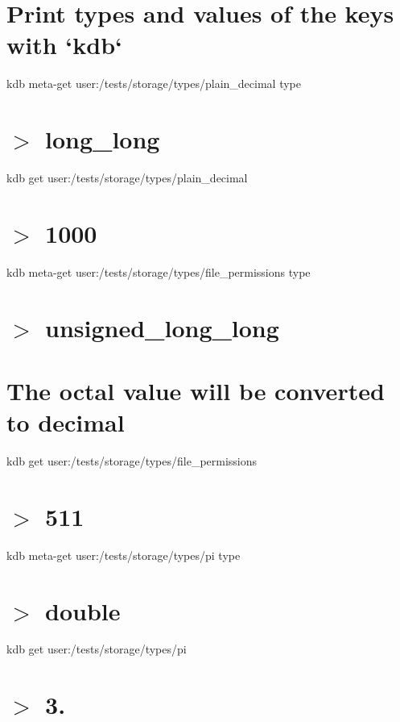 \hypertarget{autotoc_md642_autotoc_md652}{}\section{Print types and values of the keys with `kdb`}\label{autotoc_md642_autotoc_md652}
kdb meta-\/get \textquotesingle{}user\+:/tests/storage/types/plain\+\_\+decimal\textquotesingle{} \textquotesingle{}type\textquotesingle{} \hypertarget{autotoc_md642_autotoc_md653}{}\section{$>$ long\+\_\+long}\label{autotoc_md642_autotoc_md653}
kdb get \textquotesingle{}user\+:/tests/storage/types/plain\+\_\+decimal\textquotesingle{} \hypertarget{autotoc_md642_autotoc_md654}{}\section{$>$ 1000}\label{autotoc_md642_autotoc_md654}
kdb meta-\/get \textquotesingle{}user\+:/tests/storage/types/file\+\_\+permissions\textquotesingle{} \textquotesingle{}type\textquotesingle{} \hypertarget{autotoc_md642_autotoc_md655}{}\section{$>$ unsigned\+\_\+long\+\_\+long}\label{autotoc_md642_autotoc_md655}
\hypertarget{autotoc_md642_autotoc_md656}{}\section{The octal value will be converted to decimal}\label{autotoc_md642_autotoc_md656}
kdb get \textquotesingle{}user\+:/tests/storage/types/file\+\_\+permissions\textquotesingle{} \hypertarget{autotoc_md642_autotoc_md657}{}\section{$>$ 511}\label{autotoc_md642_autotoc_md657}
kdb meta-\/get \textquotesingle{}user\+:/tests/storage/types/pi\textquotesingle{} \textquotesingle{}type\textquotesingle{} \hypertarget{autotoc_md642_autotoc_md658}{}\section{$>$ double}\label{autotoc_md642_autotoc_md658}
kdb get \textquotesingle{}user\+:/tests/storage/types/pi\textquotesingle{} \hypertarget{autotoc_md642_autotoc_md659}{}\section{$>$ 3.}\label{autotoc_md642_autotoc_md659}

